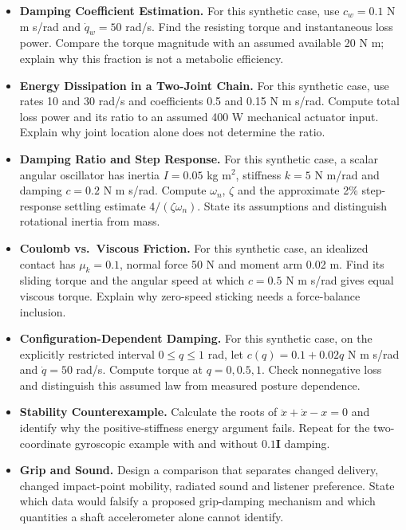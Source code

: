 \begin{itemize}
\item \textbf{Damping Coefficient Estimation.} For this synthetic case, use \(c_w=0.1\) N m s/rad and \(\dot q_w=50\) rad/s. Find the resisting torque and instantaneous loss power. Compare the torque magnitude with an assumed available 20 N m; explain why this fraction is not a metabolic efficiency.
\item \textbf{Energy Dissipation in a Two-Joint Chain.} For this synthetic case, use rates 10 and 30 rad/s and coefficients 0.5 and 0.15 N m s/rad. Compute total loss power and its ratio to an assumed 400 W mechanical actuator input. Explain why joint location alone does not determine the ratio.
\item \textbf{Damping Ratio and Step Response.} For this synthetic case, a scalar angular oscillator has inertia \(I=0.05\) kg m\(^2\), stiffness \(k=5\) N m/rad and damping \(c=0.2\) N m s/rad. Compute \(\omega_n\), \(\zeta\) and the approximate 2\% step-response settling estimate \(4/(\zeta\omega_n)\). State its assumptions and distinguish rotational inertia from mass.
\item \textbf{Coulomb vs.~Viscous Friction.} For this synthetic case, an idealized contact has \(\mu_k=0.1\), normal force 50 N and moment arm 0.02 m. Find its sliding torque and the angular speed at which \(c=0.5\) N m s/rad gives equal viscous torque. Explain why zero-speed sticking needs a force-balance inclusion.
\item \textbf{Configuration-Dependent Damping.} For this synthetic case, on the explicitly restricted interval \(0\leq q\leq1\) rad, let \(c(q)=0.1+0.02q\) N m s/rad and \(\dot q=50\) rad/s. Compute torque at \(q=0,0.5,1\). Check nonnegative loss and distinguish this assumed law from measured posture dependence.
\item \textbf{Stability Counterexample.} Calculate the roots of \(\ddot x+\dot x-x=0\) and identify why the positive-stiffness energy argument fails. Repeat for the two-coordinate gyroscopic example with and without \(0.1\mathbf I\) damping.
\item \textbf{Grip and Sound.} Design a comparison that separates changed delivery, changed impact-point mobility, radiated sound and listener preference. State which data would falsify a proposed grip-damping mechanism and which quantities a shaft accelerometer alone cannot identify.
\end{itemize}
